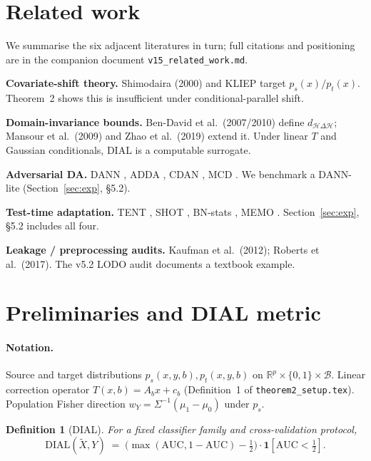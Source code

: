 \documentclass{article}
\newtheorem{definition}{Definition}
\newcommand{\R}{\mathbb{R}}
\newcommand{\dial}{\mathrm{DIAL}}
\begin{document}
\section{Related work}
\label{sec:related}
We summarise the six adjacent literatures in turn; full citations and
positioning are in the companion document
\texttt{v15\_related\_work.md}.

\textbf{Covariate-shift theory.}
Shimodaira (2000) and KLIEP \citep{sugiyama2007kliep} target
$p_s(x)/p_t(x)$. Theorem~2 shows this is insufficient under
conditional-parallel shift.

\textbf{Domain-invariance bounds.}
Ben-David et al.\ (2007/2010) define $d_{\mathcal{H}\Delta\mathcal{H}}$;
Mansour et al.\ (2009) and Zhao et al.\ (2019) extend it. Under linear
$T$ and Gaussian conditionals, DIAL is a computable surrogate.

\textbf{Adversarial DA.}
DANN \citep{ganin2016dann}, ADDA \citep{tzeng2017adda}, CDAN
\citep{long2018cdan}, MCD \citep{saito2018mcd}. We benchmark a
DANN-lite (Section~\ref{sec:exp}, §5.2).

\textbf{Test-time adaptation.}
TENT \citep{wang2021tent}, SHOT \citep{liang2020shot},
BN-stats \citep{schneider2020bn}, MEMO \citep{zhang2022memo}.
Section~\ref{sec:exp}, §5.2 includes all four.

\textbf{Leakage / preprocessing audits.}
Kaufman et al.\ (2012); Roberts et al.\ (2017). The v5.2 LODO audit
documents a textbook example.

\section{Preliminaries and DIAL metric}
\label{sec:prelim}

\paragraph{Notation.}
Source and target distributions
$p_s(x,y,b),p_t(x,y,b)$ on $\R^{p}\times\{0,1\}\times\mathcal{B}$.
Linear correction operator $T(x,b)=A_b x+c_b$ (Definition~1 of
\texttt{theorem2\_setup.tex}). Population Fisher direction
$w_Y=\Sigma^{-1}(\mu_1-\mu_0)$ under $p_s$.

\begin{definition}[DIAL]
\label{def:dial}
For a fixed classifier family and cross-validation protocol,
\[
   \dial(\tilde X,Y) \;=\; \bigl(\max(\mathrm{AUC},1{-}\mathrm{AUC})-\tfrac12\bigr)
   \cdot\mathbf{1}[\mathrm{AUC}<\tfrac12].
\]
\end{definition}
\end{document}
